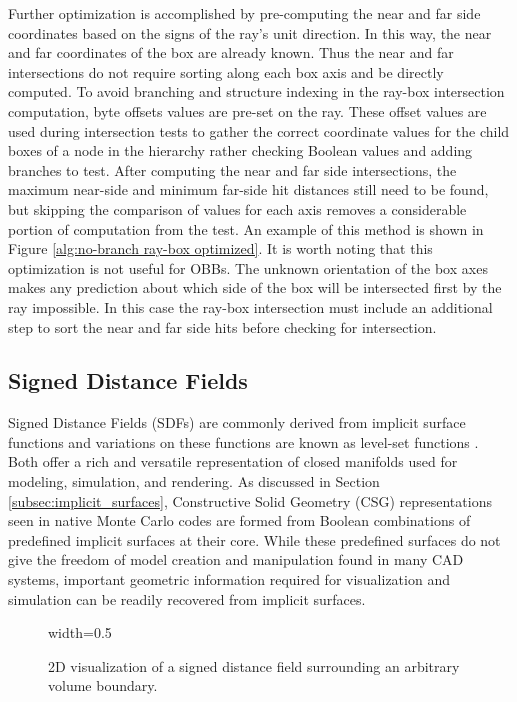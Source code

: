 Further optimization is accomplished by pre-computing the near and far side
coordinates based on the signs of the ray's unit direction. In this way, the
near and far coordinates of the box are already known. Thus the near and far
intersections do not require sorting along each box axis and be directly
computed. To avoid branching and structure indexing in the ray-box intersection
computation, byte offsets values are pre-set on the ray. These offset values are
used during intersection tests to gather the correct coordinate values for the
child boxes of a node in the hierarchy rather checking Boolean values and adding
branches to test. After computing the near and far side intersections, the
maximum near-side and minimum far-side hit distances still need to be found, but
skipping the comparison of values for each axis removes a considerable portion
of computation from the test. An example of this method is shown in Figure
\ref{alg:no-branch ray-box optimized}. It is worth noting that this optimization
is not useful for OBBs. The unknown orientation of the box axes makes any
prediction about which side of the box will be intersected first by the ray
impossible. In this case the ray-box intersection must include an additional
step to sort the near and far side hits before checking for intersection.

\subsection{Signed Distance Fields}

Signed Distance Fields (SDFs) are commonly derived from implicit surface
functions and variations on these functions are known as level-set functions
\cite{Osher_2003}. Both offer a rich and versatile representation of closed
manifolds used for modeling, simulation, and rendering. As discussed in Section
\ref{subsec:implicit_surfaces}, Constructive Solid Geometry (CSG)
representations seen in native Monte Carlo codes are formed from Boolean
combinations of predefined implicit surfaces at their core. While these
predefined surfaces do not give the freedom of model creation and manipulation
found in many CAD systems, important geometric information required for
visualization and simulation can be readily recovered from implicit surfaces.

\begin{figure}[H]
  {width=0.5\textwidth}
  \centering
  \caption[2D depiction of a signed distance field.]{2D visualization of a signed distance field surrounding an arbitrary volume boundary.}
  \label{fig:preconditioner_datastruct}
\end{figure}


